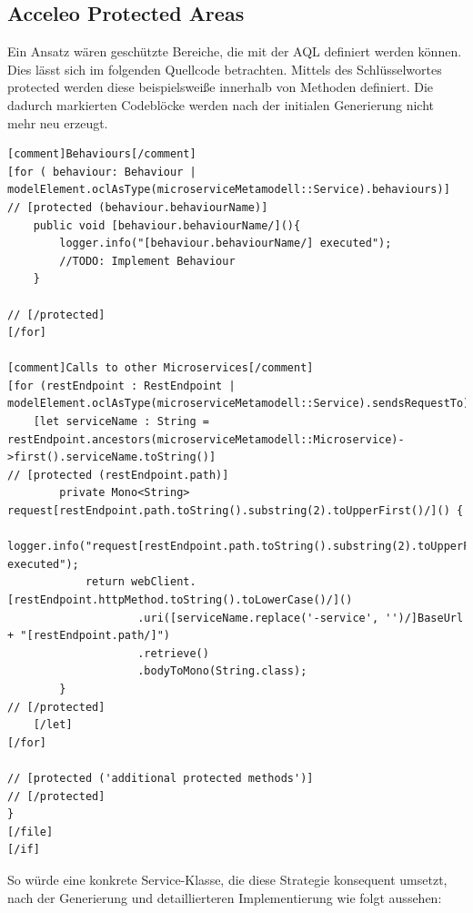 \subsection{Acceleo Protected Areas}

Ein Ansatz wären geschützte Bereiche, die mit der AQL definiert werden können. Dies lässt sich im folgenden Quellcode betrachten. Mittels des Schlüsselwortes \glqq protected\grqq{} werden diese beispielsweiße innerhalb von Methoden definiert. Die dadurch markierten Codeblöcke werden nach der initialen Generierung nicht mehr neu erzeugt.

\begin{lstlisting}[caption=Einsatz von geschützen Bereichen im Generierungstemplate]
[comment]Behaviours[/comment]
[for ( behaviour: Behaviour | modelElement.oclAsType(microserviceMetamodell::Service).behaviours)]
// [protected (behaviour.behaviourName)]
	public void [behaviour.behaviourName/](){
		logger.info("[behaviour.behaviourName/] executed");
		//TODO: Implement Behaviour
	}
	
// [/protected]
[/for]

[comment]Calls to other Microservices[/comment]
[for (restEndpoint : RestEndpoint | modelElement.oclAsType(microserviceMetamodell::Service).sendsRequestTo)]
    [let serviceName : String = restEndpoint.ancestors(microserviceMetamodell::Microservice)->first().serviceName.toString()]
// [protected (restEndpoint.path)]
        private Mono<String> request[restEndpoint.path.toString().substring(2).toUpperFirst()/]() {
            logger.info("request[restEndpoint.path.toString().substring(2).toUpperFirst()/] executed");
            return webClient.[restEndpoint.httpMethod.toString().toLowerCase()/]()
                    .uri([serviceName.replace('-service', '')/]BaseUrl + "[restEndpoint.path/]")
					.retrieve()
					.bodyToMono(String.class);
		}
// [/protected]
	[/let]
[/for]

// [protected ('additional protected methods')]
// [/protected]
}
[/file]
[/if]
\end{lstlisting}

So würde eine konkrete Service-Klasse, die diese Strategie konsequent umsetzt, nach der Generierung und detaillierteren Implementierung wie folgt aussehen:

